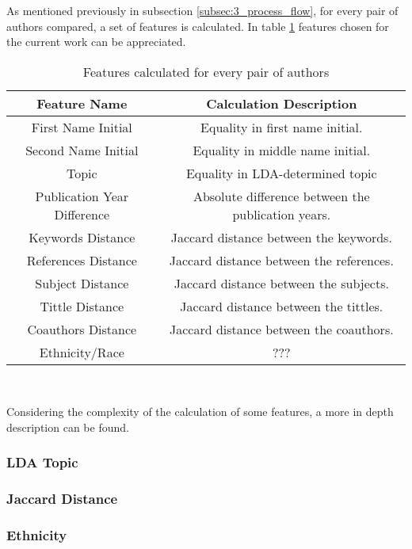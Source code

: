 \documentclass[main_article.tex]{subfiles}
\begin{document}
As mentioned previously in subsection \ref{subsec:3_process_flow}, for every pair of authors compared, a set of features is calculated. In table \ref{table:3_features} features chosen for the current work can be appreciated. \\

\begin{table} [h!] 
    \centering
    \begin{tabular} {|c|c|}
        \hline
        Feature Name & Calculation Description \\
        \hline
        First Name Initial & Equality in first name initial. \\
        Second Name Initial & Equality in middle name initial. \\
        Topic & Equality in LDA-determined topic  \\
        Publication Year Difference & Absolute difference between the publication years.  \\
        Keywords Distance & Jaccard distance between the keywords.  \\
        References Distance & Jaccard distance between the references.  \\
        Subject Distance & Jaccard distance between the subjects.  \\
        Tittle Distance & Jaccard distance between the tittles.  \\
        Coauthors Distance & Jaccard distance between the coauthors.  \\
        Ethnicity/Race & ???  \\
        \hline
    \end{tabular}
    \caption{Features calculated for every pair of authors}
    \label{table:3_features}
\end{table}
\

Considering the complexity of the calculation of some features, a more in depth description can be found.\\


\subsubsection{LDA Topic} \label{subsubsec:3_topic}

\subsubsection{Jaccard Distance} \label{subsubsec:3_jaccard}

\subsubsection{Ethnicity} \label{subsubsec:3_ethnicity}
\end{document}
